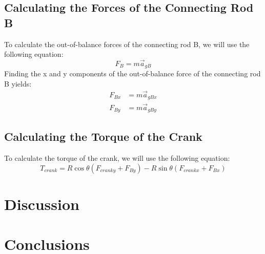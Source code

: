 \documentclass[12pt, titlepage]{article}
\begin{document}
\subsection{Calculating the Forces of the Connecting Rod B}
To calculate the out-of-balance forces of the connecting rod B, we will use the
following equation:
\begin{equation}
    \label{eq:connectingrodforce}
    F_{B} = m\vec{a}_{gB}
\end{equation}
Finding the x and y components of the out-of-balance force of the connecting
rod B yields:
\begin{equation}
    \label{eq:connectingrodforcexy}
    \begin{split}
      F_{Bx} &= m\vec{a}_{gBx}\\
      F_{By} &= m\vec{a}_{gBy}
    \end{split}
\end{equation}
\subsection{Calculating the Torque of the Crank}
To calculate the torque of the crank, we will use the following equation:
\begin{equation}
    \label{eq:cranktorque}
    T_{crank} = R\cos\theta (F_{cranky} + F_{By}) - 
    R\sin\theta (F_{crankx} + F_{Bx})
\end{equation}
\newpage
\section{Discussion}
\newpage
\section{Conclusions}
\newpage
\end{document}
